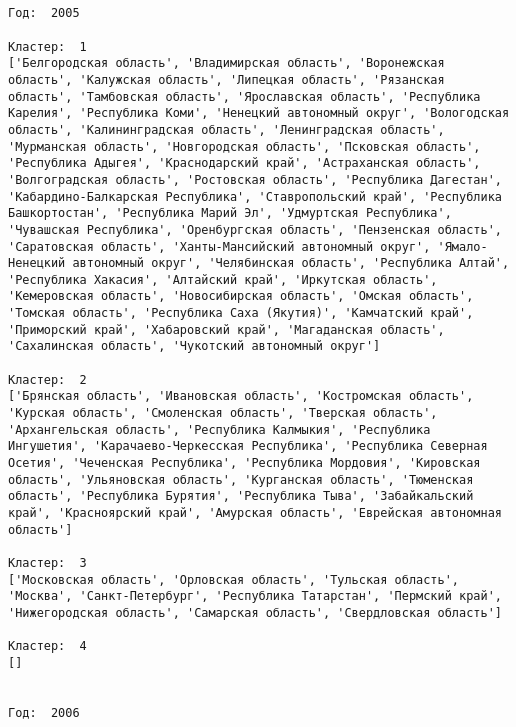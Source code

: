 \documentclass[11pt]{article}
\begin{document}
    \begin{Verbatim}[commandchars=\\\{\}]


Год:  2005

Кластер:  1
['Белгородская область', 'Владимирская область', 'Воронежская область', 'Калужская область', 'Липецкая область', 'Рязанская область', 'Тамбовская область', 'Ярославская область', 'Республика Карелия', 'Республика Коми', 'Ненецкий автономный округ', 'Вологодская область', 'Калинингpадская область', 'Ленинградская область', 'Мурманская область', 'Новгородская область', 'Псковская область', 'Республика Адыгея', 'Краснодарский край', 'Астраханская область', 'Волгоградская область', 'Ростовская область', 'Республика Дагестан', 'Кабардино-Балкарская Республика', 'Ставропольский край', 'Республика Башкортостан', 'Республика Марий Эл', 'Удмуртская Республика', 'Чувашская Республика', 'Оренбургская область', 'Пензенская область', 'Саратовская область', 'Ханты-Мансийский автономный округ', 'Ямало-Ненецкий автономный округ', 'Челябинская область', 'Республика Алтай', 'Республика Хакасия', 'Алтайский край', 'Иркутская область', 'Кемеровская область', 'Новосибирская область', 'Омская область', 'Томская область', 'Республика Саха (Якутия)', 'Камчатский край', 'Приморский край', 'Хабаровский край', 'Магаданская область', 'Сахалинская область', 'Чукотский автономный округ']

Кластер:  2
['Брянская область', 'Ивановская область', 'Костромская область', 'Курская область', 'Смоленская область', 'Тверская область', 'Архангельская область', 'Республика Калмыкия', 'Республика Ингушетия', 'Карачаево-Черкесская Республика', 'Республика Северная Осетия', 'Чеченская Республика', 'Республика Мордовия', 'Кировская область', 'Ульяновская область', 'Курганская область', 'Тюменская область', 'Республика Бурятия', 'Республика Тыва', 'Забайкальский край', 'Красноярский край', 'Амурская область', 'Еврейская автономная область']

Кластер:  3
['Московская область', 'Орловская область', 'Тульская область', 'Москва', 'Санкт-Петербург', 'Республика Татарстан', 'Пермский край', 'Нижегородская область', 'Самарская область', 'Свердловская область']

Кластер:  4
[]


Год:  2006


\end{Verbatim}
\end{document}
